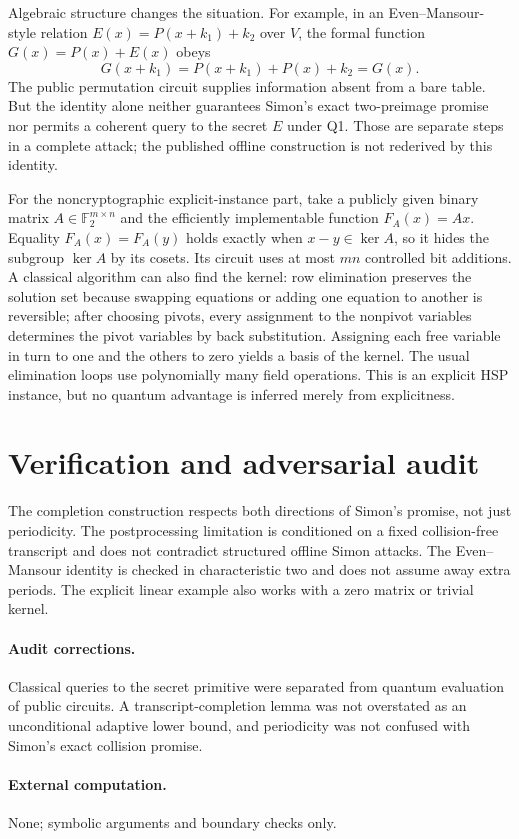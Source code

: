 \documentclass[11pt]{article}
\begin{document}
Algebraic structure changes the situation. For example, in an Even--Mansour-style relation $E(x)=P(x+k_1)+k_2$ over $V$, the formal function
$G(x)=P(x)+E(x)$ obeys
\[
 G(x+k_1)=P(x+k_1)+P(x)+k_2=G(x).
\]
The public permutation circuit supplies information absent from a bare table. But the identity alone neither guarantees Simon's exact two-preimage promise nor permits a coherent query to the secret $E$ under Q1. Those are separate steps in a complete attack; the published offline construction is not rederived by this identity.

For the noncryptographic explicit-instance part, take a publicly given binary matrix $A\in\mathbb F_2^{m\times n}$ and the efficiently implementable function $F_A(x)=Ax$. Equality $F_A(x)=F_A(y)$ holds exactly when $x-y\in\ker A$, so it hides the subgroup $\ker A$ by its cosets. Its circuit uses at most $mn$ controlled bit additions. A classical algorithm can also find the kernel: row elimination preserves the solution set because swapping equations or adding one equation to another is reversible; after choosing pivots, every assignment to the nonpivot variables determines the pivot variables by back substitution. Assigning each free variable in turn to one and the others to zero yields a basis of the kernel. The usual elimination loops use polynomially many field operations. This is an explicit HSP instance, but no quantum advantage is inferred merely from explicitness.
\section{Verification and adversarial audit}
The completion construction respects both directions of Simon's promise, not just periodicity. The postprocessing limitation is conditioned on a fixed collision-free transcript and does not contradict structured offline Simon attacks. The Even--Mansour identity is checked in characteristic two and does not assume away extra periods. The explicit linear example also works with a zero matrix or trivial kernel.
\paragraph{Audit corrections.} Classical queries to the secret primitive were separated from quantum evaluation of public circuits. A transcript-completion lemma was not overstated as an unconditional adaptive lower bound, and periodicity was not confused with Simon's exact collision promise.
\paragraph{External computation.} None; symbolic arguments and boundary checks only.
\end{document}
